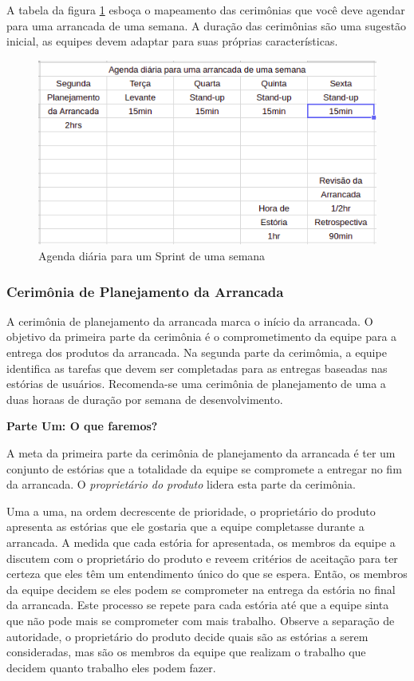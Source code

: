 \documentclass[
	11pt,				%
	openright,
	twoside,			%
	a4paper,			%
	english,			%
	french,
	brazil,				%
	sumario=tradicional
	]{abntex2}
\begin{document}
A tabela da figura \ref{fig:sprint} esboça o mapeamento das cerimônias que você deve agendar para uma arrancada de uma semana. A duração das cerimônias são uma sugestão inicial, as equipes devem adaptar para suas próprias características.

\begin{figure}[h]
\begin{center}
\includegraphics[scale=0.6]{sprint_planning.png}
\caption{Agenda diária para um Sprint de uma semana} \label{fig:sprint}
\end{center}
\end{figure}

\subsubsection{Cerimônia de Planejamento da Arrancada}

A cerimônia de planejamento da arrancada marca o início da arrancada. O objetivo da primeira parte da cerimônia é o comprometimento da equipe para a entrega dos produtos da arrancada. Na segunda parte da cerimômia, a equipe identifica as tarefas que devem ser completadas para as entregas baseadas nas estórias de usuários. Recomenda-se uma cerimônia de planejamento de uma a duas horaas de duração por semana de desenvolvimento.

\noindent \textbf{\small Parte Um: O que faremos?}

A meta da primeira parte da cerimônia de planejamento da arrancada é ter um conjunto de estórias que a totalidade da equipe se compromete a entregar no fim da arrancada. O \emph{proprietário do produto} lidera esta parte da cerimônia.

Uma a uma, na ordem decrescente de prioridade, o proprietário do produto apresenta as estórias que ele gostaria que a equipe completasse durante a arrancada. A medida que cada estória for apresentada, os membros da equipe a discutem com o proprietário do produto e reveem critérios de aceitação para ter certeza que eles têm um entendimento único do que se espera. Então, os membros da equipe decidem se eles podem se comprometer na entrega da estória no final da arrancada. Este processo se repete para cada estória até que a equipe sinta que não pode mais se comprometer com mais trabalho. Observe a separação de autoridade, o proprietário do produto decide quais são as estórias a serem consideradas, mas são os membros da equipe que realizam o trabalho que decidem quanto trabalho eles podem fazer.
\end{document}
